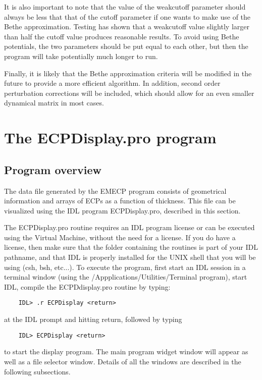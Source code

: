 \documentclass[DIV=calc, paper=letter, fontsize=11pt]{scrartcl}	 %
\begin{document}
It is also important to note that the value of the \textsf{weakcutoff} parameter should always be less that
that of the \textsf{cutoff} parameter if one wants to make use of the Bethe approximation.  Testing has shown
that a \textsf{weakcutoff} value slightly larger than half the \textsf{cutoff} value produces reasonable 
results.  To avoid using Bethe potentials, the two parameters should be put equal to each other, but then the 
program will take potentially much longer to run.

Finally, it is likely that the Bethe approximation criteria will be modified in the future to provide a more
efficient algorithm.  In addition, second order perturbation corrections will be included, which should allow
for an even smaller dynamical matrix in most cases.


\section{The \protect\textsf{ECPDisplay.pro} program\label{sec:idl}}

\subsection{Program overview\label{sec:idloverview}}
The data file generated by the \textsf{EMECP} program consists of geometrical information and arrays of ECPs 
as a function of thickness.  This file can be visualized using the IDL program
\textsf{ECPDisplay.pro}, described in this section.

The \textsf{ECPDisplay.pro} routine requires an IDL program license or can be executed using the Virtual Machine, without the need for a license. 
If you do have a license, then make sure that the folder containing the routines is part of your IDL pathname,
and that IDL is properly installed for the UNIX shell that you will be using (csh, bsh, etc...).
To execute the program, first start an IDL session in a terminal window (using the /Appplications/Utilities/Terminal program), 
start IDL, compile the \textsf{ECPDdisplay.pro} routine by typing:
\begin{verbatim}
	IDL> .r ECPDisplay <return>
\end{verbatim}
at the IDL prompt and hitting return, followed by typing 
\begin{verbatim}
	IDL> ECPDisplay <return>
\end{verbatim}
to start the display program.  The main program widget window will appear as well as a file selector window.  
Details of all the windows are described in the following subsections.
\end{document}
